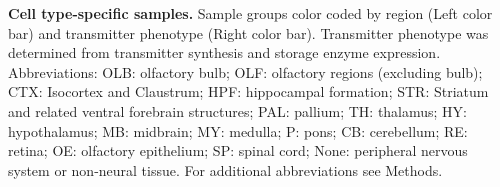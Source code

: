 \textbf{Cell type-specific samples.} Sample groups color coded by region (Left color bar) and transmitter phenotype (Right color bar). Transmitter phenotype was determined from transmitter synthesis and storage enzyme expression. Abbreviations: OLB: olfactory bulb; OLF: olfactory regions (excluding bulb); CTX: Isocortex and Claustrum; HPF: hippocampal formation; STR: Striatum and related ventral forebrain structures; PAL: pallium; TH: thalamus; HY: hypothalamus; MB: midbrain; MY: medulla; P: pons; CB: cerebellum; RE: retina; OE: olfactory epithelium; SP: spinal cord; None: peripheral nervous system or non-neural tissue. For additional abbreviations see Methods.
